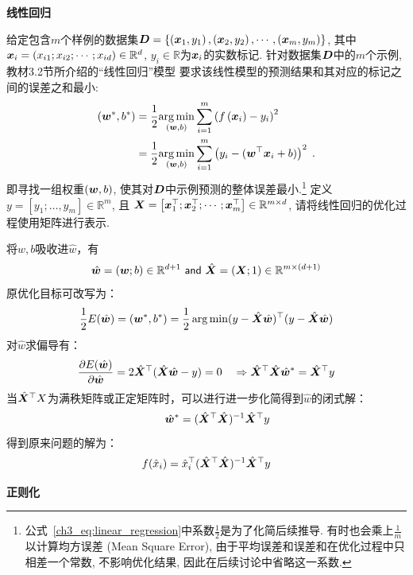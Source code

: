 \documentclass[answers]{exam}  %
\begin{document}
\begin{questions}
\question [15] \textbf{线性回归}

给定包含$m$个样例的数据集$\boldsymbol{D}=\left\{\left({\boldsymbol{x}}_{1}, y_{1}\right),\left({\boldsymbol{x}}_{2}, y_{2}\right), \cdots,\left({\boldsymbol{x}}_{m}, y_{m}\right)\right\}$, 其中${\boldsymbol{x}}_{i}=\left(x_{i 1} ; x_{i 2} ; \cdots ; x_{i d}\right) \in \mathbb{R}^{d}$, $y_{i} \in\mathbb{R}$为${\boldsymbol{x}}_{i}$的实数标记.
针对数据集$\boldsymbol{D}$中的$m$个示例, 教材3.2节所介绍的“线性回归”模型 要求该线性模型的预测结果和其对应的标记之间的误差之和最小:
\begin{align}
\left(\boldsymbol{w}^{*}, b^{*}\right) &=\frac{1}{2}\underset{(\boldsymbol{w}, b)}{\arg \min } \sum_{i=1}^{m}\left(f\left({\boldsymbol{x}}_{i}\right)-y_{i}\right)^{2} \notag\\
&=\frac{1}{2}\underset{(\boldsymbol{w}, b)}{\arg \min } \sum_{i=1}^{m}\left(y_{i}-(\boldsymbol{w}^\top {\boldsymbol{x}}_{i}+b)\right)^{2}\;.\label{ch3_eq:linear_regression}
\end{align}
即寻找一组权重$(\boldsymbol{w}, b)$, 使其对$\boldsymbol{D}$中示例预测的整体误差最小.\footnote{公式~\ref{ch3_eq:linear_regression}中系数$\frac{1}{2}$是为了化简后续推导. 有时也会乘上$\frac{1}{m}$以计算均方误差 (Mean Square Error), 由于平均误差和误差和在优化过程中只相差一个常数, 不影响优化结果, 因此在后续讨论中省略这一系数.}
定义$y=\left[y_{1}; \ldots, y_{m}\right] \in \mathbb{R}^{m}$, 且 $\boldsymbol{X}=\left[{\boldsymbol{x}}_{1}^\top ; {\boldsymbol{x}}_{2}^\top ; \cdots ; {\boldsymbol{x}}_{m}^\top\right] \in \mathbb{R}^{m \times d}$, 请将线性回归的优化过程使用矩阵进行表示.
	
	\begin{solution}
			将$w,b$吸收进$\hat w$，有
			$$ \hat\vw=(\vw;b)\in \mathbb{R}^{d+1}\ \mathsf{and}\ \hat \mX=(\mX;1)\in\mathbb{R}^{m\times (d+1)}$$
			原优化目标可改写为：
			$$\frac12E(\hat {\boldsymbol{w}})=(\boldsymbol{w}^*,b^*)=\frac12\operatorname{arg\,min}(y-\hat {\boldsymbol{X}}\hat {\boldsymbol{w}})^\top (y-\hat {\boldsymbol{X}}\hat {\boldsymbol{w}})$$
			对$\hat w$求偏导有：
			$$\frac{\partial E(\hat {\boldsymbol{w}})}{\partial\hat {\boldsymbol{w}}}=2\hat {\boldsymbol{X}}^\top(\hat{\boldsymbol{X}}\hat {\boldsymbol{w}}-y)=0\quad\Rightarrow \hat {\boldsymbol{X}}^\top \hat {\boldsymbol{X}}\hat {\boldsymbol{w}}^*=\hat {\boldsymbol{X}}^\top y$$
			当$\hat {\boldsymbol{X}}^\top X$为满秩矩阵或正定矩阵时，可以进行进一步化简得到$\hat w$的闭式解：
			$$\quad\quad\hat {\boldsymbol{w}}^*=(\hat {\boldsymbol{X}}^\top \hat {\boldsymbol{X}})^{-1}\hat {\boldsymbol{X}}^\top y$$
			得到原来问题的解为：
			$$f(\hat x_i)=\hat x_i^\top(\hat {\boldsymbol{X}}^\top \hat {\boldsymbol{X}})^{-1}\hat {\boldsymbol{X}}^\top y$$
	\end{solution}


\question [25] \textbf{正则化}


\end{questions}
\end{document}
